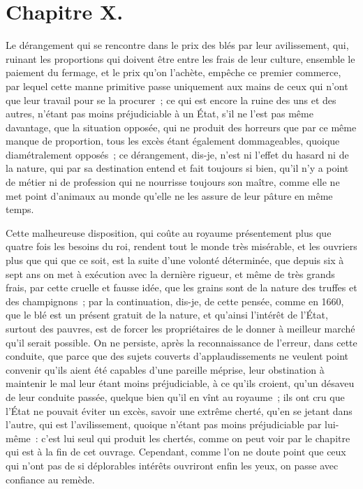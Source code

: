 \documentclass[french,twoside]{book} %
\begin{document}
\section[{Chapitre X.}]{Chapitre X.}
\noindent Le dérangement qui se rencontre dans le prix des blés par leur avilissement, qui, ruinant les proportions qui doivent être entre les frais de leur culture, ensemble le paiement du fermage, et le prix qu’on l’achète, empêche ce premier commerce, par lequel cette manne primitive passe uniquement aux mains de ceux qui n’ont que leur travail pour se la procurer ; ce qui est encore la ruine des uns et des autres, n’étant pas moins préjudiciable à un État, s’il ne l’est pas même davantage, que la situation opposée, qui ne produit des horreurs que par ce même manque de proportion, tous les excès étant également dommageables, quoique diamétralement opposés ; ce dérangement, dis-je, n’est ni l’effet du hasard ni de la nature, qui par sa destination entend et fait toujours si bien, qu’il n’y a point de métier ni de profession qui ne nourrisse toujours son maître, comme elle ne met point d’animaux au monde qu’elle ne les assure de leur pâture en même temps.\par
Cette malheureuse disposition, qui coûte au royaume présentement plus que quatre fois les besoins du roi, rendent tout le monde très misérable, et les ouvriers plus que qui que ce soit, est la suite d’une volonté déterminée, que depuis six à sept ans on met à exécution avec la dernière rigueur, et même de très grands frais, par cette cruelle et fausse idée, que les grains sont de la nature des truffes et des champignons ; par la continuation, dis-je, de cette pensée, comme en 1660, que le blé est un présent gratuit de la nature, et qu’ainsi l’intérêt de l’État, surtout des pauvres, est de forcer les propriétaires de le donner à meilleur marché qu’il serait possible. On ne persiste, après la reconnaissance de l’erreur, dans cette conduite, que parce que des sujets couverts d’applaudissements ne veulent point convenir qu’ils aient été capables d’une pareille méprise, leur obstination à maintenir le mal leur étant moins préjudiciable, à ce qu’ils croient, qu’un désaveu de leur conduite passée, quelque bien qu’il en vînt au royaume ; ils ont cru que l’État ne pouvait éviter un excès, savoir une extrême cherté, qu’en se jetant dans l’autre, qui est l’avilissement, quoique n’étant pas moins préjudiciable par lui-même : c’est lui seul qui produit les chertés, comme on peut voir par le chapitre qui est à la fin de cet ouvrage. Cependant, comme l’on ne doute point que ceux qui n’ont pas de si déplorables intérêts ouvriront enfin les yeux, on passe avec confiance au remède.\par
\end{document}
